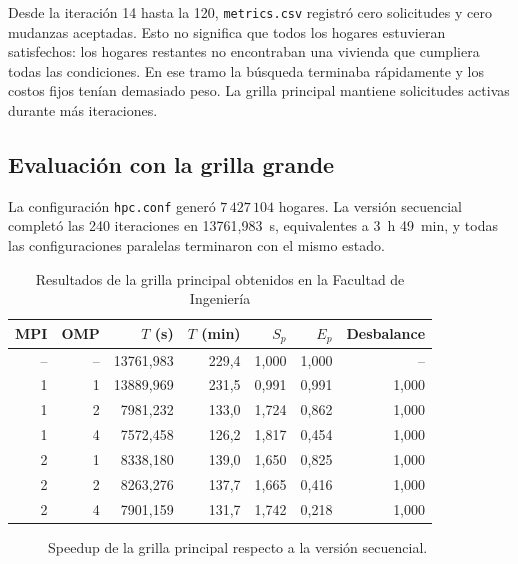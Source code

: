 Desde la iteración 14 hasta la 120, \texttt{metrics.csv} registró cero solicitudes y cero mudanzas aceptadas. Esto no significa que todos los hogares estuvieran satisfechos: los hogares restantes no encontraban una vivienda que cumpliera todas las condiciones. En ese tramo la búsqueda terminaba rápidamente y los costos fijos tenían demasiado peso. La grilla principal mantiene solicitudes activas durante más iteraciones.

\subsection{Evaluación con la grilla grande}

La configuración \texttt{hpc.conf} generó $7\,427\,104$ hogares. La versión secuencial
completó las 240 iteraciones en 13761,983~s, equivalentes a 3~h 49~min, y
todas las configuraciones paralelas terminaron con el mismo estado.

\begin{table}[ht]
\centering
\caption{Resultados de la grilla principal obtenidos en la Facultad de Ingeniería}
\label{tab:resultados-hpc}
\scriptsize
\setlength{\tabcolsep}{2.5pt}
\begin{tabular}{rrrrrrr}
\toprule
MPI & OMP & $T$ (s) & $T$ (min) & $S_p$ & $E_p$ & Desbalance \\
\midrule
-- & -- & 13761,983 & 229,4 & 1,000 & 1,000 & -- \\
1 & 1 & 13889,969 & 231,5 & 0,991 & 0,991 & 1,000 \\
1 & 2 & 7981,232 & 133,0 & 1,724 & 0,862 & 1,000 \\
1 & 4 & 7572,458 & 126,2 & 1,817 & 0,454 & 1,000 \\
2 & 1 & 8338,180 & 139,0 & 1,650 & 0,825 & 1,000 \\
2 & 2 & 8263,276 & 137,7 & 1,665 & 0,416 & 1,000 \\
2 & 4 & 7901,159 & 131,7 & 1,742 & 0,218 & 1,000 \\
\bottomrule
\end{tabular}
\end{table}

\begin{figure}[ht]
\centering
{}
\caption{Speedup de la grilla principal respecto a la versión secuencial.}
\label{fig:speedup-hpc}
\end{figure}

